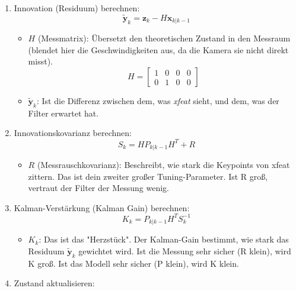\documentclass{article}
\begin{document}
\begin{enumerate}
    \item Innovation (Residuum) berechnen:
        \begin{equation}
            \tilde{\mathbf{y}}_k = \mathbf{z}_k - H \mathbf{x}_{k|k-1}
        \end{equation}
        \begin{itemize}
            \item $H$ (Messmatrix): Übersetzt den theoretischen Zustand in den Messraum (blendet hier die Geschwindigkeiten aus, da die Kamera sie nicht direkt misst).
            \begin{equation}
                H = \begin{bmatrix} 
                1 & 0 & 0 & 0 \\ 
                0 & 1 & 0 & 0 
                \end{bmatrix}
            \end{equation}
            \item $\tilde{\mathbf{y}}_k$: Ist die Differenz zwischen dem, was \textit{xfeat} sieht, und dem, was der Filter erwartet hat.
        \end{itemize}
    \item Innovationskovarianz berechnen:
        \begin{equation}
            S_k = H P_{k|k-1} H^T + R
        \end{equation}
        \begin{itemize}
            \item $R$ (Messrauschkovarianz): Beschreibt, wie stark die Keypoints von xfeat zittern. Das ist dein zweiter großer Tuning-Parameter. Ist R groß, vertraut der Filter der Messung wenig.
        \end{itemize}
    \item Kalman-Verstärkung (Kalman Gain) berechnen:
        \begin{equation}
            K_k = P_{k|k-1} H^T S_k^{-1}
        \end{equation}
        \begin{itemize}
            \item $K_k$: Das ist das "Herzstück". Der Kalman-Gain bestimmt, wie stark das Residuum $\tilde{\mathbf{y}}_k$ gewichtet wird. Ist die Messung sehr sicher (R klein), wird K groß. Ist das Modell sehr sicher (P klein), wird K klein.
        \end{itemize}
    \item Zustand aktualisieren:
        \begin{equation}

\end{equation}
\end{enumerate}
\end{document}
